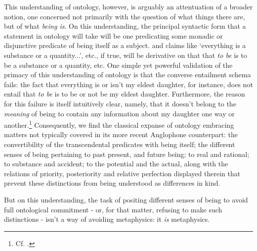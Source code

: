 \documentclass[]{article}
\begin{document}
This understanding of ontology, 
however, 
is arguably 
an attentuation of a broader notion, 
one concerned not primarily with the question of what things there are, but of what \emph{being is}. 
On this understanding, 
the principal syntactic form that a statement in ontology will take will be one predicating some monadic or disjunctive predicate of being itself as a subject. 
and claims like `everything is a substance or a quantity...', etc., 
if true, 
will be derivative on that that \emph{to be} is to be a substance or a quantity, etc. 
One simple yet powerful validation of the primacy of this understanding of ontology is that the converse entailment schema fails: 
the fact that everything is or isn't my eldest daughter, for instance, 
does not entail that \emph{to be} is to be or not be my eldest daughter. 
Furthermore, the reason for this failure is itself intuitively clear, 
namely, 
that it doesn't belong to the \emph{meaning} of being to contain any information about my daughter one way or another.\footnote{Cf. \autocite{Fine1994}.}
Consequently, we find the classical expanse of ontology embracing matters not typically covered in its more recent Anglophone counterpart: 
the convertibility of the transcendental predicates with being itself;  
the different senses of being pertaining 
to past present, and future being; 
to real and rational; 
to substance and accident; 
to the potential and the actual, 
along with the relations of priority, posteriority and relative perfection displayed therein
that prevent these distinctions from being understood as differences in kind. 

But on this understanding, the task of positing different senses of being to avoid full ontological commitment - 
or, for that matter, refusing to make such distinctions - 
isn't a way of avoiding metaphysics: it \emph{is} metaphysics.
\end{document}
